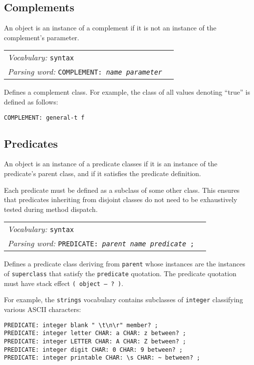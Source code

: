\documentclass{book}
\newcommand{\vocabulary}[1]{\emph{Vocabulary:} \texttt{#1}&\\}
\newcommand{\parsingword}[2]{\index{\texttt{#1}}\emph{Parsing word:} \texttt{#2}&\\}
\newcommand{\wordtable}[1]{


\begin{tabularx}{12cm}{lX}
\hline
#1
\hline
\end{tabularx}

}
\begin{document}
\subsection{Complements}

An object is an instance of a complement if it is not an instance of the complement's parameter.
\wordtable{
\vocabulary{syntax}
\parsingword{COMPLEMENT:}{COMPLEMENT: \emph{name} \emph{parameter}}
}
Defines a complement class. For example, the class of all values denoting ``true'' is defined as follows:
\begin{verbatim}
COMPLEMENT: general-t f
\end{verbatim}

\subsection{Predicates}
An object is an instance of a predicate classes if it is an instance of the predicate's parent class, and if it satisfies the predicate definition.

Each predicate must be
defined as a subclass of some other class. This ensures that predicates inheriting from disjoint classes do not need to be
exhaustively tested during method dispatch.
\wordtable{
\vocabulary{syntax}
\parsingword{PREDICATE:}{PREDICATE: \emph{parent} \emph{name} \emph{predicate} ;}
}
Defines a predicate class deriving from \texttt{parent} whose instances are the instances of \texttt{superclass} that satisfy the \texttt{predicate} quotation. The predicate quotation must have stack effect \texttt{( object -- ?~)}.

For example, the \texttt{strings} vocabulary contains subclasses of \texttt{integer}
classifying various ASCII characters:
\begin{verbatim}
PREDICATE: integer blank " \t\n\r" member? ;
PREDICATE: integer letter CHAR: a CHAR: z between? ;
PREDICATE: integer LETTER CHAR: A CHAR: Z between? ;
PREDICATE: integer digit CHAR: 0 CHAR: 9 between? ;
PREDICATE: integer printable CHAR: \s CHAR: ~ between? ;
\end{verbatim}
\end{document}
